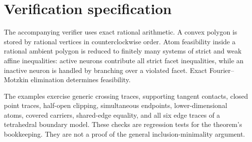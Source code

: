 \section{Verification specification}\label{app:verify}

The accompanying verifier uses exact rational arithmetic.  A convex polygon
is stored by rational vertices in counterclockwise order.  Atom feasibility
inside a rational ambient polygon is reduced to finitely many systems of
strict and weak affine inequalities: active neurons contribute all strict
facet inequalities, while an inactive neuron is handled by branching over a
violated facet.  Exact Fourier--Motzkin elimination determines feasibility.

The examples exercise generic crossing traces, supporting tangent contacts,
closed point traces, half-open clipping, simultaneous endpoints,
lower-dimensional atoms, covered carriers, shared-edge equality, and all six
edge traces of a tetrahedral boundary model.  These checks are regression
tests for the theorem's bookkeeping.  They are not a proof of the general
inclusion-minimality argument.
